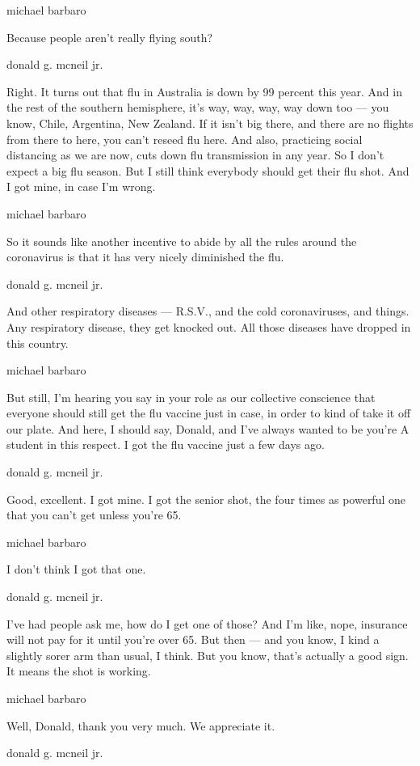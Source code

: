 michael barbaro

Because people aren't really flying south?

donald g. mcneil jr.

Right. It turns out that flu in Australia is down by 99 percent this
year. And in the rest of the southern hemisphere, it's way, way, way,
way down too --- you know, Chile, Argentina, New Zealand. If it isn't
big there, and there are no flights from there to here, you can't reseed
flu here. And also, practicing social distancing as we are now, cuts
down flu transmission in any year. So I don't expect a big flu season.
But I still think everybody should get their flu shot. And I got mine,
in case I'm wrong.

michael barbaro

So it sounds like another incentive to abide by all the rules around the
coronavirus is that it has very nicely diminished the flu.

donald g. mcneil jr.

And other respiratory diseases --- R.S.V., and the cold coronaviruses,
and things. Any respiratory disease, they get knocked out. All those
diseases have dropped in this country.

michael barbaro

But still, I'm hearing you say in your role as our collective conscience
that everyone should still get the flu vaccine just in case, in order to
kind of take it off our plate. And here, I should say, Donald, and I've
always wanted to be you're A student in this respect. I got the flu
vaccine just a few days ago.

donald g. mcneil jr.

Good, excellent. I got mine. I got the senior shot, the four times as
powerful one that you can't get unless you're 65.

michael barbaro

I don't think I got that one.

donald g. mcneil jr.

I've had people ask me, how do I get one of those? And I'm like, nope,
insurance will not pay for it until you're over 65. But then --- and you
know, I kind a slightly sorer arm than usual, I think. But you know,
that's actually a good sign. It means the shot is working.

michael barbaro

Well, Donald, thank you very much. We appreciate it.

donald g. mcneil jr.

